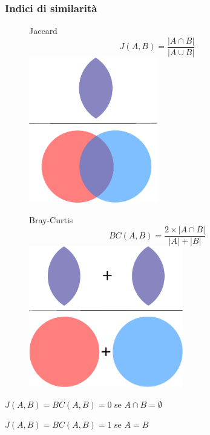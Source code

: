 \begin{frame}
	\frametitle{Indici di similarità}
	\centering
	
	\small
	\pause
	\begin{figure}[h]
		\begin{minipage}[t]{.48\textwidth}
			\centering
			\Large
			Jaccard
			\small
			\medskip
			\begin{equation*}
				J(A,B) = \frac{|A \cap B|}{|A \cup B|}
			\end{equation*}
			\includegraphics[width=0.5\textwidth]{images/4_jaccard}
		\end{minipage}\hfill
		\pause
		\begin{minipage}[t]{.48\textwidth}
			\centering
			\Large
			Bray-Curtis
			\small
			\medskip
			\begin{equation*}
			BC(A,B) = \frac{2 \times |A \cap B|}{|A| + |B|}
			\end{equation*}
			\includegraphics[width=0.6\textwidth]{images/5_bray_curtis}
			
		\end{minipage}\hfill		
	\end{figure}
	\small
	\pause
	
	$J(A,B) = BC(A,B) = 0$ se $A \cap B = \emptyset$\medskip
	
	$J(A,B) = BC(A,B) = 1$ se $A = B$ \phantom{$\cap \emptyset.$}
	
\end{frame}

